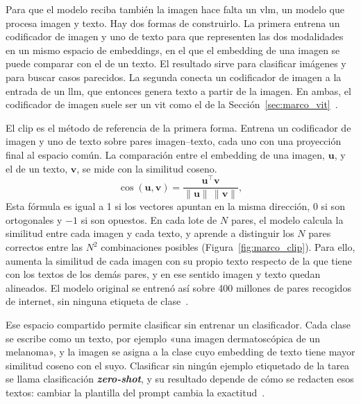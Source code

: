 Para que el modelo reciba también la imagen hace falta un \gls{vlm}, un modelo que procesa imagen y texto. Hay
dos formas de construirlo. La primera entrena un
codificador de imagen y uno de texto para que representen las dos modalidades en un mismo espacio de
embeddings, en el que el embedding de una imagen se puede comparar con el de un texto. El resultado sirve para
clasificar imágenes y para buscar casos parecidos. La segunda conecta un codificador de
imagen a la entrada de un \gls{llm}, que entonces genera texto a partir de la imagen. En ambas, el codificador
de imagen suele ser un \gls{vit} como el de la Sección~\ref{sec:marco_vit}~\cite{radford2021learning,liu2023visual}.

El \gls{clip} es el método de referencia de la primera forma. Entrena un codificador de imagen y uno de texto
sobre pares imagen--texto, cada uno con una proyección final al espacio común. La comparación entre el
embedding de una imagen, $\mathbf{u}$, y el de un texto, $\mathbf{v}$, se mide con la similitud coseno.
\begin{equation}
    \cos(\mathbf{u}, \mathbf{v}) = \frac{\mathbf{u}^{\top}\mathbf{v}}{\lVert\mathbf{u}\rVert\,\lVert\mathbf{v}\rVert},
    \label{eq:marco_cos}
\end{equation}
Esta fórmula es igual a 1 si los vectores apuntan en la misma dirección, 0 si son ortogonales y $-1$ si son opuestos. En cada
lote de $N$ pares, el modelo calcula la similitud entre cada imagen y cada texto, y aprende a distinguir los $N$
pares correctos entre las $N^2$ combinaciones posibles (Figura~\ref{fig:marco_clip}). Para ello, aumenta la
similitud de cada imagen con su propio texto respecto de la que tiene con los textos de los demás pares, y en
ese sentido imagen y texto quedan alineados. El modelo original se entrenó así sobre 400 millones de pares
recogidos de internet, sin ninguna etiqueta de clase~\cite{radford2021learning}.



Ese espacio compartido permite clasificar sin entrenar un clasificador. Cada clase se escribe como un texto, por
ejemplo «una imagen dermatoscópica de un melanoma», y la imagen se asigna a la clase cuyo embedding de texto
tiene mayor similitud coseno con el suyo. Clasificar sin ningún ejemplo etiquetado de la tarea se llama
clasificación \textbf{\emph{zero-shot}}, y su resultado depende de cómo se redacten esos textos: cambiar la plantilla del prompt cambia la
exactitud~\cite{radford2021learning}.


